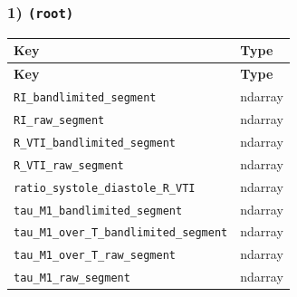 \documentclass[11pt]{article}
\begin{document}
\subsubsection*{1) \texttt{(root)}}
\begin{longtable}{|p{}|p{}|}
\hline
\textbf{Key} & \textbf{Type} \\ \hline
\endfirsthead
\hline
\textbf{Key} & \textbf{Type} \\ \hline
\endhead
\texttt{RI\_\allowbreak{}bandlimited\_\allowbreak{}segment} & ndarray \\ \hline
\texttt{RI\_\allowbreak{}raw\_\allowbreak{}segment} & ndarray \\ \hline
\texttt{R\_\allowbreak{}VTI\_\allowbreak{}bandlimited\_\allowbreak{}segment} & ndarray \\ \hline
\texttt{R\_\allowbreak{}VTI\_\allowbreak{}raw\_\allowbreak{}segment} & ndarray \\ \hline
\texttt{ratio\_\allowbreak{}systole\_\allowbreak{}diastole\_\allowbreak{}R\_\allowbreak{}VTI} & ndarray \\ \hline
\texttt{tau\_\allowbreak{}M1\_\allowbreak{}bandlimited\_\allowbreak{}segment} & ndarray \\ \hline
\texttt{tau\_\allowbreak{}M1\_\allowbreak{}over\_\allowbreak{}T\_\allowbreak{}bandlimited\_\allowbreak{}segment} & ndarray \\ \hline
\texttt{tau\_\allowbreak{}M1\_\allowbreak{}over\_\allowbreak{}T\_\allowbreak{}raw\_\allowbreak{}segment} & ndarray \\ \hline
\texttt{tau\_\allowbreak{}M1\_\allowbreak{}raw\_\allowbreak{}segment} & ndarray \\ \hline
\end{longtable}
\end{document}
